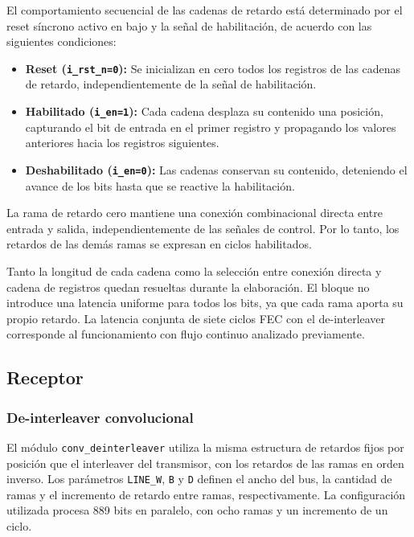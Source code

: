 \documentclass[10pt,a4paper]{article}
\begin{document}
El comportamiento secuencial de las cadenas de retardo está
determinado por el reset síncrono activo en bajo y la señal de
habilitación, de acuerdo con las siguientes condiciones:

\begin{itemize}
    \item \textbf{Reset (\texttt{i\_rst\_n=0}):}
    Se inicializan en cero todos los registros de las cadenas
    de retardo, independientemente de la señal de habilitación.

    \item \textbf{Habilitado (\texttt{i\_en=1}):}
    Cada cadena desplaza su contenido una posición, capturando
    el bit de entrada en el primer registro y propagando los
    valores anteriores hacia los registros siguientes.

    \item \textbf{Deshabilitado (\texttt{i\_en=0}):}
    Las cadenas conservan su contenido, deteniendo el avance
    de los bits hasta que se reactive la habilitación.
\end{itemize}

La rama de retardo cero mantiene una conexión combinacional
directa entre entrada y salida, independientemente de las señales
de control. Por lo tanto, los retardos de las demás ramas se
expresan en ciclos habilitados.

Tanto la longitud de cada cadena como la selección entre conexión
directa y cadena de registros quedan resueltas durante la elaboración.
El bloque no introduce una latencia uniforme para todos los bits,
ya que cada rama aporta su propio retardo. La latencia conjunta
de siete ciclos FEC con el de-interleaver corresponde al
funcionamiento con flujo continuo analizado previamente.

\subsection{Receptor}

\subsubsection{De-interleaver convolucional}

El módulo \texttt{conv\_deinterleaver} utiliza la misma estructura de
retardos fijos por posición que el interleaver del transmisor, con
los retardos de las ramas en orden inverso. Los parámetros
\texttt{LINE\_W}, \texttt{B} y \texttt{D} definen el ancho del bus,
la cantidad de ramas y el incremento de retardo entre ramas,
respectivamente. La configuración utilizada procesa 889 bits en
paralelo, con ocho ramas y un incremento de un ciclo.
\end{document}
